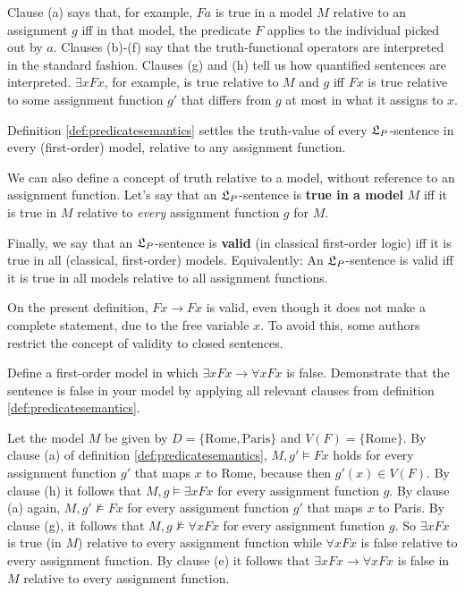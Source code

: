 Clause (a) says that, for example, $Fa$ is true in a model $M$ relative to an
assignment $g$ iff in that model, the predicate $F$ applies to the individual
picked out by $a$. Clauses (b)-(f) say that the truth-functional operators are
interpreted in the standard fashion. Clauses (g) and (h) tell us how quantified
sentences are interpreted. $\exists x Fx$, for example, is true relative to $M$
and $g$ iff $Fx$ is true relative to some assignment function $g'$ that differs
from $g$ at most in what it assigns to $x$.

Definition \ref{def:predicatesemantics} settles the truth-value of every
$\mathfrak{L}_P$-sentence in every (first-order) model, relative to any assignment
function.

We can also define a concept of truth relative to a model, without reference to
an assignment function. Let's say that an $\mathfrak{L}_P$-sentence is \textbf{true in a
  model} $M$ iff it is true in $M$ relative to \emph{every} assignment function
$g$ for $M$.

Finally, we say that an $\mathfrak{L}_P$-sentence is \textbf{valid} (in classical
first-order logic) iff it is true in all (classical, first-order)
models. Equivalently: An $\mathfrak{L}_P$-sentence is valid iff it is true in all models
relative to all assignment functions.

On the present definition, $Fx \to Fx$ is valid, even though it does not make a
complete statement, due to the free variable $x$. To avoid this, some authors
restrict the concept of validity to closed sentences.


\begin{exercise}
  Define a first-order model in which $\exists x Fx \to \forall x Fx$ is
  false. Demonstrate that the sentence is false in your model by applying all
  relevant clauses from definition \ref{def:predicatesemantics}.
\end{exercise}
\begin{solution}
  Let the model $M$ be given by $D = \{ \text{Rome}, \text{Paris} \}$ and
  $V(F) = \{ \text{Rome} \}$. By clause (a) of definition
  \ref{def:predicatesemantics}, $M,g' \models Fx$ holds for every assignment
  function $g'$ that maps $x$ to Rome, because then $g'(x) \in V(F)$. By clause
  (h) it follows that $M,g \models \exists x Fx$ for every assignment function
  $g$. By clause (a) again, $M, g' \not\models Fx$ for every assignment function
  $g'$ that maps $x$ to Paris. By clause (g), it follows that
  $M,g \not\models \forall x Fx$ for every assignment function $g$. So
  $\exists x Fx$ is true (in $M$) relative to every assignment function while
  $\forall x Fx$ is false relative to every assignment function. By clause (e)
  it follows that $\exists x Fx \to \forall x Fx$ is false in $M$ relative to
  every assignment function.
\end{solution}

